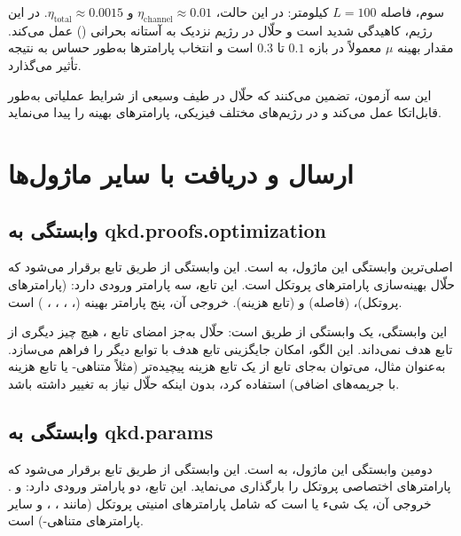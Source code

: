 سوم، فاصله $L = 100$ کیلومتر: در این حالت، $\eta_{\text{channel}} \approx 0.01$ و $\eta_{\text{total}} \approx 0.0015$. در این رژیم، کاهیدگی شدید است و حلّال در رژیم نزدیک به آستانه بحرانی  () عمل می‌کند. مقدار بهینه $\mu$ معمولاً در بازه $0.1$ تا $0.3$ است و انتخاب پارامترها به‌طور حساس به نتیجه تأثیر می‌گذارد.

این سه آزمون، تضمین می‌کنند که حلّال در طیف وسیعی از شرایط عملیاتی به‌طور قابل‌اتکا عمل می‌کند و در رژیم‌های مختلف فیزیکی، پارامترهای بهینه را پیدا می‌نماید.

\section{ارسال و دریافت با سایر ماژول‌ها}

\subsection{وابستگی به qkd.proofs.optimization}

اصلی‌ترین وابستگی این ماژول، به  است. این وابستگی از طریق تابع  برقرار می‌شود که حلّال بهینه‌سازی پارامترهای پروتکل  است. این تابع، سه پارامتر ورودی دارد:  (پارامترهای پروتکل)،  (فاصله) و  (تابع هزینه). خروجی آن، پنج پارامتر بهینه (، ، ، \lr{$\mu$}، \lr{$\nu$}) است.

این وابستگی، یک وابستگی  از طریق  است: حلّال به‌جز امضای تابع ، هیچ چیز دیگری از تابع هدف نمی‌داند. این الگو، امکان جایگزینی تابع هدف با توابع دیگر را فراهم می‌سازد. به‌عنوان مثال، می‌توان به‌جای تابع  از یک تابع هزینه پیچیده‌تر (مثلاً  متناهی- یا تابع هزینه با جریمه‌های اضافی) استفاده کرد، بدون اینکه حلّال نیاز به تغییر داشته باشد.

\subsection{وابستگی به qkd.params}

دومین وابستگی این ماژول، به  است. این وابستگی از طریق تابع  برقرار می‌شود که پارامترهای اختصاصی پروتکل  را بارگذاری می‌نماید. این تابع، دو پارامتر ورودی دارد:  و . خروجی آن، یک شیء  یا  است که شامل پارامترهای امنیتی پروتکل (مانند ، ،  و سایر پارامترهای متناهی-) است.

